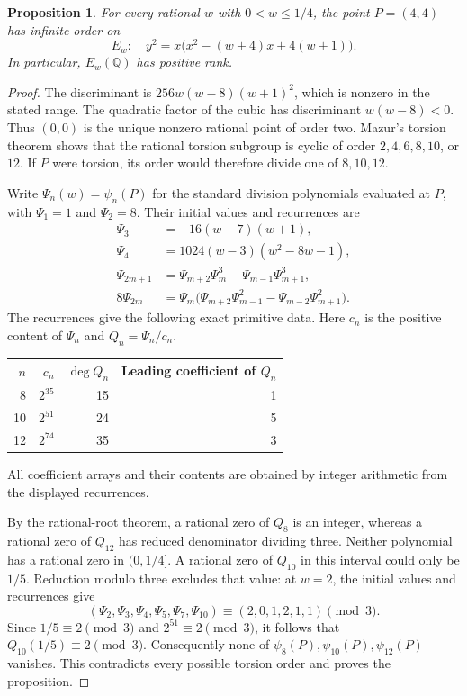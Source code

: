 \documentclass[11pt,a4paper]{article}
\newtheorem{proposition}[theorem]{Proposition}
\newcommand{\Q}{\mathbb Q}\newcommand{\Z}{\mathbb Z}
\begin{document}
\begin{proposition}\label{prop:smallcubic-rank}
For every rational $w$ with $0<w\le1/4$, the point $P=(4,4)$
has infinite order on
\[
 E_w:\quad y^2=x\bigl(x^2-(w+4)x+4(w+1)\bigr).
\]
In particular, $E_w(\Q)$ has positive rank.
\end{proposition}
\begin{proof}
The discriminant is $256w(w-8)(w+1)^2$, which is nonzero in the
stated range. The quadratic factor of the cubic has discriminant
$w(w-8)<0$. Thus $(0,0)$ is the unique nonzero rational point of
order two. Mazur's torsion theorem
\cite[Introduction, Theorem~(8), p.~35]{Mazur1977} shows that the
rational torsion subgroup is cyclic of order $2,4,6,8,10$, or $12$.
If $P$ were torsion, its order would therefore divide one of
$8,10,12$.

Write $\Psi_n(w)=\psi_n(P)$ for the standard division polynomials
evaluated at $P$, with $\Psi_1=1$ and $\Psi_2=8$. Their initial
values and recurrences are
\begin{align*}
 \Psi_3&=-16(w-7)(w+1),\\
 \Psi_4&=1024(w-3)(w^2-8w-1),\\
 \Psi_{2m+1}&=\Psi_{m+2}\Psi_m^3-
                     \Psi_{m-1}\Psi_{m+1}^3,\\
 8\Psi_{2m}&=\Psi_m\bigl(\Psi_{m+2}\Psi_{m-1}^2-
                     \Psi_{m-2}\Psi_{m+1}^2\bigr).
\end{align*}
The recurrences give the following exact primitive data. Here
$c_n$ is the positive content of $\Psi_n$ and $Q_n=\Psi_n/c_n$.
\begin{center}
\begin{tabular}{rrrr}\toprule
$n$&$c_n$&$\deg Q_n$&Leading coefficient of $Q_n$\\\midrule
8&$2^{35}$&15&1\\
10&$2^{51}$&24&5\\
12&$2^{74}$&35&3\\\bottomrule
\end{tabular}
\end{center}
All coefficient arrays and their contents are obtained by integer
arithmetic from the displayed recurrences.

By the rational-root theorem, a rational zero of $Q_8$ is an
integer, whereas a rational zero of $Q_{12}$ has reduced denominator
dividing three. Neither polynomial has a rational zero in
$(0,1/4]$. A rational zero of $Q_{10}$ in this interval could only
be $1/5$. Reduction modulo three excludes that value: at $w=2$,
the initial values and recurrences give
\[
 (\Psi_2,\Psi_3,\Psi_4,\Psi_5,\Psi_7,\Psi_{10})
                    \equiv(2,0,1,2,1,1)\pmod3.
\]
Since $1/5\equiv2\pmod3$ and $2^{51}\equiv2\pmod3$, it follows
that $Q_{10}(1/5)\equiv2\pmod3$. Consequently none of
$\psi_8(P),\psi_{10}(P),\psi_{12}(P)$ vanishes. This contradicts
every possible torsion order and proves the proposition.
\end{proof}
\end{document}
